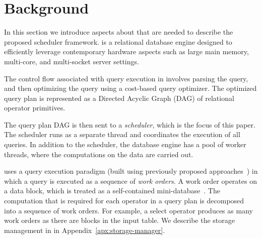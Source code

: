 \section{Background}\label{sec:background}
In this section we introduce aspects about \sys{} that are needed to 
describe the proposed scheduler framework.
\sys{} is a relational database engine 
designed to efficiently leverage contemporary hardware aspects such as large main memory, multi-core, and multi-socket server settings. 

The control flow associated with query execution in \sys{} involves 
parsing the query, and then optimizing the query using a cost-based query 
optimizer.
The optimized query plan is represented as a Directed Acyclic 
Graph (DAG) of relational operator primitives. 

The query plan DAG is then sent to a \textit{scheduler}, which is the focus of this paper. 
The scheduler runs as a separate thread and coordinates the execution of all queries. 
In addition to the scheduler, the database engine has a pool of worker 
threads, where the computations on the data are carried out. 

\sys{} uses a query execution paradigm (built using previously proposed approaches~\cite{qsstorage,morsel}) in which a query is executed as a sequence of \textit{work orders}. 
A work order operates on a data block, which is treated as a self-contained mini-database~\cite{qsstorage}. 
The computation that is required for each operator in a query plan is decomposed into a sequence of work orders. 
For example, a select operator produces as many work orders as there are blocks in the input table. 
We describe the storage management in \sys{} in Appendix~\ref{apx:storage-manager}.